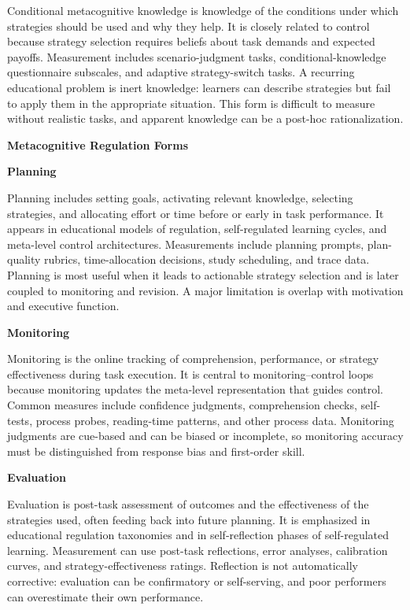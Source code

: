 \documentclass{book}
\providecommand{\ProjectDeepHeading}[2]{%
    \par\medskip\noindent\textbf{#2}\par\smallskip
}
\begin{document}
   Conditional metacognitive knowledge is knowledge of the conditions under which strategies should be used and why they help. It is closely related to control because strategy selection requires beliefs about task demands and expected payoffs. Measurement includes scenario-judgment tasks, conditional-knowledge questionnaire subscales, and adaptive strategy-switch tasks. A recurring educational problem is inert knowledge: learners can describe strategies but fail to apply them in the appropriate situation. This form is difficult to measure without realistic tasks, and apparent knowledge can be a post-hoc rationalization.

   \ProjectDeepHeading{6}{Metacognitive Regulation Forms}

   \ProjectDeepHeading{7}{Planning}

   Planning includes setting goals, activating relevant knowledge, selecting strategies, and allocating effort or time before or early in task performance. It appears in educational models of regulation, self-regulated learning cycles, and meta-level control architectures. Measurements include planning prompts, plan-quality rubrics, time-allocation decisions, study scheduling, and trace data. Planning is most useful when it leads to actionable strategy selection and is later coupled to monitoring and revision. A major limitation is overlap with motivation and executive function.

   \ProjectDeepHeading{7}{Monitoring}

   Monitoring is the online tracking of comprehension, performance, or strategy effectiveness during task execution. It is central to monitoring--control loops because monitoring updates the meta-level representation that guides control. Common measures include confidence judgments, comprehension checks, self-tests, process probes, reading-time patterns, and other process data. Monitoring judgments are cue-based and can be biased or incomplete, so monitoring accuracy must be distinguished from response bias and first-order skill.

   \ProjectDeepHeading{7}{Evaluation}

   Evaluation is post-task assessment of outcomes and the effectiveness of the strategies used, often feeding back into future planning. It is emphasized in educational regulation taxonomies and in self-reflection phases of self-regulated learning. Measurement can use post-task reflections, error analyses, calibration curves, and strategy-effectiveness ratings. Reflection is not automatically corrective: evaluation can be confirmatory or self-serving, and poor performers can overestimate their own performance.
\end{document}
